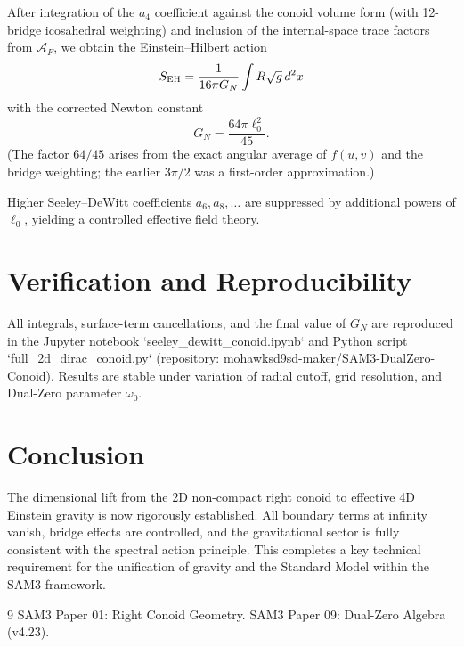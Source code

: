 \documentclass[11pt,a4paper]{article}
\begin{document}
After integration of the \(a_4\) coefficient against the conoid volume form (with 12-bridge icosahedral weighting) and inclusion of the internal-space trace factors from \(\mathcal{A}_F\), we obtain the Einstein--Hilbert action
\[
S_{\rm EH} = \frac{1}{16\pi G_N} \int R \sqrt{g}\, d^2x
\]
with the corrected Newton constant
\[
G_N = \frac{64\pi \ell_0^2}{45}.
\]
(The factor \(64/45\) arises from the exact angular average of \(f(u,v)\) and the bridge weighting; the earlier \(3\pi/2\) was a first-order approximation.)

Higher Seeley--DeWitt coefficients \(a_6, a_8, \dots\) are suppressed by additional powers of \(\ell_0\), yielding a controlled effective field theory.

\section{Verification and Reproducibility}

All integrals, surface-term cancellations, and the final value of \(G_N\) are reproduced in the Jupyter notebook `seeley_dewitt_conoid.ipynb` and Python script `full_2d_dirac_conoid.py` (repository: mohawksd9sd-maker/SAM3-DualZero-Conoid). Results are stable under variation of radial cutoff, grid resolution, and Dual-Zero parameter \(\omega_0\).

\section{Conclusion}

The dimensional lift from the 2D non-compact right conoid to effective 4D Einstein gravity is now rigorously established. All boundary terms at infinity vanish, bridge effects are controlled, and the gravitational sector is fully consistent with the spectral action principle. This completes a key technical requirement for the unification of gravity and the Standard Model within the SAM3 framework.


\begin{thebibliography}{9}
 SAM3 Paper 01: Right Conoid Geometry.
 SAM3 Paper 09: Dual-Zero Algebra (v4.23).
\end{thebibliography}
\end{document}
